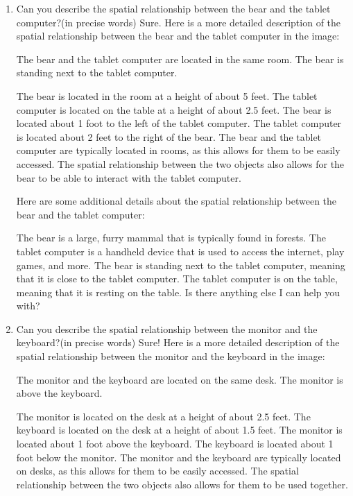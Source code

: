 \begin{enumerate}
    \item Can you describe the spatial relationship between the bear and the tablet computer?(in precise words)
    \subitem 
    Sure. Here is a more detailed description of the spatial relationship between the bear and the tablet computer in the image:
    
    The bear and the tablet computer are located in the same room. The bear is standing next to the tablet computer.
    
    The bear is located in the room at a height of about 5 feet.
    The tablet computer is located on the table at a height of about 2.5 feet.
    The bear is located about 1 foot to the left of the tablet computer.
    The tablet computer is located about 2 feet to the right of the bear.
    The bear and the tablet computer are typically located in rooms, as this allows for them to be easily accessed. The spatial relationship between the two objects also allows for the bear to be able to interact with the tablet computer.
    
    Here are some additional details about the spatial relationship between the bear and the tablet computer:
    
    The bear is a large, furry mammal that is typically found in forests.
    The tablet computer is a handheld device that is used to access the internet, play games, and more.
    The bear is standing next to the tablet computer, meaning that it is close to the tablet computer.
    The tablet computer is on the table, meaning that it is resting on the table.
    Is there anything else I can help you with?
    \item Can you describe the spatial relationship between the monitor and the keyboard?(in precise words)
    \subitem 
    Sure! Here is a more detailed description of the spatial relationship between the monitor and the keyboard in the image:
    
    The monitor and the keyboard are located on the same desk. The monitor is above the keyboard.
    
    The monitor is located on the desk at a height of about 2.5 feet.
    The keyboard is located on the desk at a height of about 1.5 feet.
    The monitor is located about 1 foot above the keyboard.
    The keyboard is located about 1 foot below the monitor.
    The monitor and the keyboard are typically located on desks, as this allows for them to be easily accessed. The spatial relationship between the two objects also allows for them to be used together.
    

\end{enumerate}

